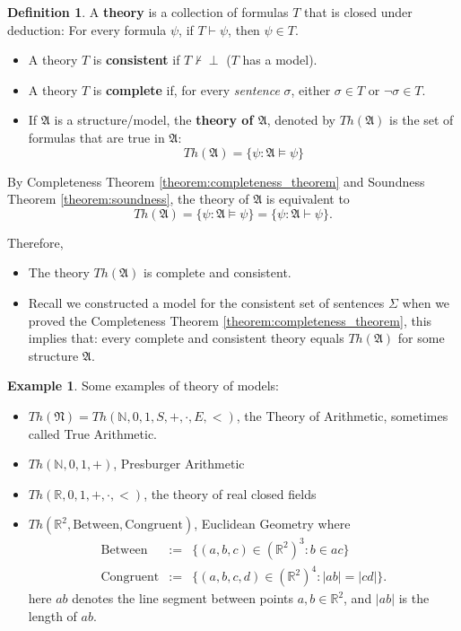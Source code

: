 \documentclass[11pt,letterpaper]{book}
\theoremstyle{definition}
\newtheorem{definition}{Definition}[section]
\newtheorem{example}{Example}[section]
\begin{document}
\begin{definition}
A \textbf{theory} is a collection of formulas $T$ that is closed under deduction: For every formula $\psi$, if $T \vdash \psi$, then $\psi \in T$.

\begin{itemize}
\item{A theory $T$ is \textbf{consistent} if $T \not \vdash \perp $ ($T$ has a model).}
\item{A theory $T$ is \textbf{complete} if, for every \emph{sentence} $\sigma$, either $\sigma \in T$ or $\lnot \sigma \in T$.}
\item{If $\mathfrak{A}$ is a structure/model, the \textbf{theory of $\mathfrak{A}$}, denoted by $Th(\mathfrak{A})$ is the set of formulas that are true in $\mathfrak{A}$:
$$Th(\mathfrak{A}) = \{ \psi : \mathfrak{A} \models \psi \}  $$
}
\end{itemize}

\end{definition}

By Completeness Theorem \ref{theorem:completeness_theorem} and Soundness Theorem \ref{theorem:soundness}, the theory of $\mathfrak{A}$ is equivalent to
$$ Th(\mathfrak{A}) = \{ \psi : \mathfrak{A} \models \psi \} =  \{ \psi : \mathfrak{A} \vdash \psi \} . $$

Therefore, 
\begin{itemize}
\item{The theory $Th(\mathfrak{A})$ is complete and consistent.}
\item{Recall we constructed a model for the consistent set of sentences $\Sigma$ when we proved the Completeness Theorem \ref{theorem:completeness_theorem}, this implies that: every complete and consistent theory equals $Th(\mathfrak{A})$ for some structure $\mathfrak{A}$.}
\end{itemize}

\begin{example}
Some examples of theory of models:
\begin{itemize}
\item{$Th(\mathfrak{N}) = Th(\mathbb{N}, 0,1, S, +, \cdot, E, <  )$, the Theory of Arithmetic, sometimes called True Arithmetic.}
\item{$Th(\mathbb{N}, 0, 1, +)$, Presburger Arithmetic}
\item{$Th( \mathbb{R}, 0, 1, +, \cdot, < )$, the theory of real closed fields}
\item{$Th(\mathbb{R}^2 , \text{Between}, \text{Congruent} )$, Euclidean Geometry where
\begin{eqnarray*}
\text{Between} &:=& \{ (a, b, c) \in ( \mathbb{R}^2 )^3 : b \in ac \} \\
\text{Congruent} &:=& \{ (a, b, c, d) \in ( \mathbb{R}^2 )^4 : | a b | = | c d | \} .
\end{eqnarray*}
here $a b$ denotes the line segment between points $a, b \in \mathbb{R}^2$, and $| a b | $ is the length of $a b$.
}
\end{itemize}
\end{example}
\end{document}
